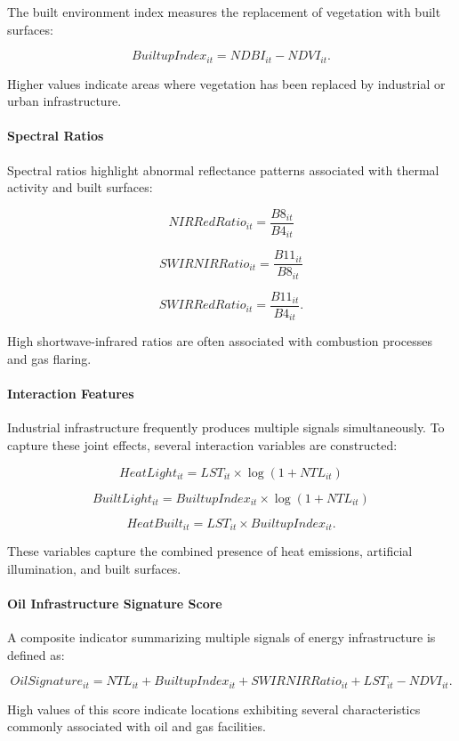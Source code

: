 \documentclass[12pt]{article}
\begin{document}
The built environment index measures the replacement of vegetation with built surfaces:

\[
BuiltupIndex_{it} = NDBI_{it} - NDVI_{it}.
\]

Higher values indicate areas where vegetation has been replaced by industrial or urban infrastructure.

\paragraph{Spectral Ratios}

Spectral ratios highlight abnormal reflectance patterns associated with thermal activity and built surfaces:

\[
NIRRedRatio_{it} = \frac{B8_{it}}{B4_{it}}
\]

\[
SWIRNIRRatio_{it} = \frac{B11_{it}}{B8_{it}}
\]

\[
SWIRRedRatio_{it} = \frac{B11_{it}}{B4_{it}}.
\]

High shortwave-infrared ratios are often associated with combustion processes and gas flaring.

\paragraph{Interaction Features}

Industrial infrastructure frequently produces multiple signals simultaneously. To capture these joint effects, several interaction variables are constructed:

\[
HeatLight_{it} = LST_{it} \times \log(1 + NTL_{it})
\]

\[
BuiltLight_{it} = BuiltupIndex_{it} \times \log(1 + NTL_{it})
\]

\[
HeatBuilt_{it} = LST_{it} \times BuiltupIndex_{it}.
\]

These variables capture the combined presence of heat emissions, artificial illumination, and built surfaces.

\paragraph{Oil Infrastructure Signature Score}

A composite indicator summarizing multiple signals of energy infrastructure is defined as:

\[
OilSignature_{it} =
NTL_{it}
+
BuiltupIndex_{it}
+
SWIRNIRRatio_{it}
+
LST_{it}
-
NDVI_{it}.
\]

High values of this score indicate locations exhibiting several characteristics commonly associated with oil and gas facilities.
\end{document}
